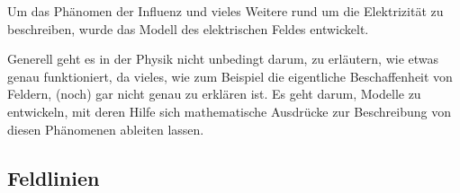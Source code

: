 




%
%	





Um das Phänomen der Influenz und vieles Weitere rund um die Elektrizität zu beschreiben, wurde das Modell des elektrischen Feldes entwickelt. 

\begin{NiceToKnow}
Generell geht es in der Physik nicht unbedingt darum, zu erläutern, wie etwas genau funktioniert, da vieles, wie zum Beispiel die eigentliche Beschaffenheit von Feldern, (noch) gar nicht genau zu erklären ist. Es geht darum, Modelle zu entwickeln, mit deren Hilfe sich mathematische Ausdrücke zur Beschreibung von diesen Phänomenen ableiten lassen.
\end{NiceToKnow}


\subsection{Feldlinien}

